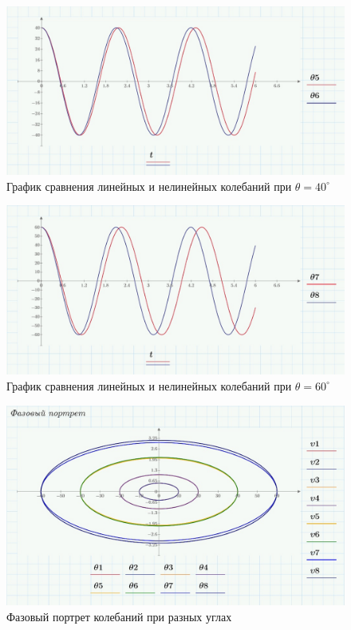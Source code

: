 \documentclass[a4paper, 14pt]{extarticle}
\begin{document}
		\begin{figure}[H]
			\centering
			\includegraphics[width = \linewidth]{6.jpg}
			\caption[.] {График сравнения линейных и нелинейных колебаний при $\theta = 40^{\circ}$}
		\end{figure}
		\begin{figure}[H]
			\centering
			\includegraphics[width = \linewidth]{8.jpg}
			\caption[.] {График сравнения линейных и нелинейных колебаний при $\theta = 60^{\circ}$}
		\end{figure}	
		\begin{figure}[H]
			\centering
			\includegraphics[width = \linewidth]{9.jpg}
			\caption[.] {Фазовый портрет колебаний при разных углах}
		\end{figure}
\end{document}
